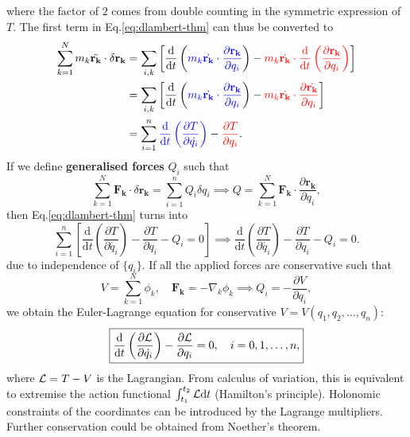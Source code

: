 \documentclass{article}
\begin{document}
where the factor of $2$ comes from double counting in the symmetric expression of $T.$ The first term in Eq.\eqref{eq:dlambert-thm} can thus be converted to
\begin{align*}
    \sum_{k=1}^{N} m_k \ddot{\mathbf{r_k} } \cdot \delta \mathbf{r_k} 
    &= \sum_{i,k} \left[ \frac{\mathrm{d}}{\mathrm{d}t} \left( \textcolor{blue}{m_k \dot{\mathbf{r_k}}\cdot \frac{\partial \mathbf{r_k} }{\partial q_i}}  \right) - \textcolor{red}{m_k \dot{\mathbf{r_k} } \cdot \frac{\mathrm{d}}{\mathrm{d}t} \left(\frac{\partial \mathbf{r_k}}{\partial q_i} \right)}\right] \\
    &= \sum_{i,k} \left[ \frac{\mathrm{d}}{\mathrm{d}t} \left( \textcolor{blue}{m_k \dot{\mathbf{r_k}}\cdot \frac{\partial \mathbf{r_k} }{\partial q_i}}  \right) - \textcolor{red}{m_k \dot{\mathbf{r_k} } \cdot \frac{\partial \dot{\mathbf{r_k} } }{\partial q_i} }\right] \\
    &= \sum_{i=1}^{n} \textcolor{blue}{\frac{\mathrm{d}}{\mathrm{d}t} \left( \frac{\partial T}{\partial \dot{q_i} } \right)} - \textcolor{red}{\frac{\partial T}{\partial q_i} }.
\end{align*}
If we define \textbf{generalised forces} $Q_i$ such that
\[
    \sum_{k=1}^{N} \mathbf{F_k} \cdot \delta \mathbf{r_k}
    = \sum_{i=1}^{n} Q_i \delta q_i 
    \implies  
    \boxed{Q = \sum_{k=1}^{N} \mathbf{F_k} \cdot \frac{\partial \mathbf{r_k} }{\partial q_i},}  
\] 
then Eq.\ref{eq:dlambert-thm} turns into
\[
    \sum_{i=1}^{n} \left[ \frac{\mathrm{d}}{\mathrm{d}t} \left( \frac{\partial T}{\partial \dot{q_i} } \right) - \frac{\partial T}{\partial q_i} -Q_i = 0\right]
    \implies 
    \boxed{\frac{\mathrm{d}}{\mathrm{d}t} \left( \frac{\partial T}{\partial \dot{q_i} } \right) - \frac{\partial T}{\partial q_i} -Q_i = 0.}
\]
due to independence of $\{q_i\}.$ If all the applied forces are conservative such that 
\[
    V = \sum_{k=1}^{N} \phi_k,\quad \mathbf{F_k} = -\nabla_k \phi_k \implies 
    Q_i = -\frac{\partial V}{\partial q_i}, 
\]
we obtain the Euler-Lagrange equation for conservative $V= V(q_1, q_2, \ldots, q_n )$:
\[
    \boxed{ 
        \frac{\mathrm{d}}{\mathrm{d}t} \left( \frac{\partial \mathcal{\MakeUppercase{L}} }{\partial \dot{q_i} } \right) - \frac{\partial \mathcal{\MakeUppercase{L}} }{\partial q_i} =0, \quad i = 0, 1, \ldots , n, 
    }
\]
where $\mathcal{\MakeUppercase{L}} = T - V$ is the Lagrangian. From calculus of variation, this is equivalent to extremise the action functional $\int_{t_1}^{t_2} \mathcal{\MakeUppercase{L}} \mathrm{d} t$ (Hamilton's principle). Holonomic constraints of the coordinates can be introduced by the Lagrange multipliers. Further conservation could be obtained from Noether's theorem. 
\end{document}
